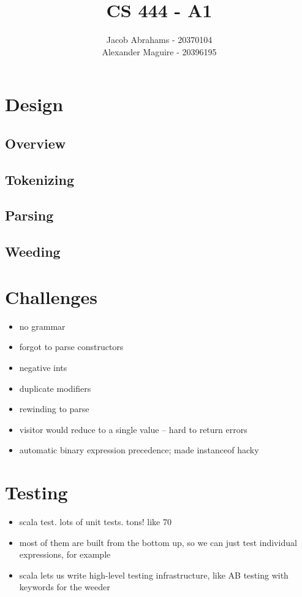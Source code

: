 \documentclass{article}
\title{CS 444 - A1}
\author{Jacob Abrahams - 20370104\\ Alexander Maguire - 20396195}
\begin{document}
\maketitle

\section{Design}


\subsection{Overview}


\subsection{Tokenizing}


\subsection{Parsing}


\subsection{Weeding}




\section{Challenges}

\begin{itemize}
    \item no grammar
    \item forgot to parse constructors
    \item negative ints
    \item duplicate modifiers
    \item rewinding to parse
    \item visitor would reduce to a single value -- hard to return errors
    \item automatic binary expression precedence; made instanceof hacky
\end{itemize}




\section{Testing}

\begin{itemize}
    \item scala test. lots of unit tests. tons! like 70
    \item most of them are built from the bottom up, so we can just test individual expressions, for example
    \item scala lets us write high-level testing infrastructure, like AB testing with keywords for the weeder
\end{itemize}
\end{document}
